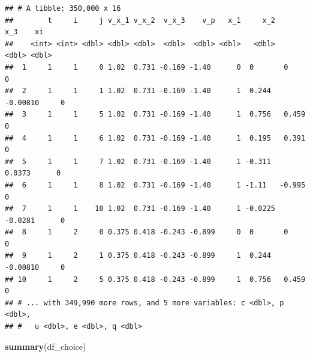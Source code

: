 \documentclass[]{book}
\newenvironment{Shaded}{\begin{snugshade}}{\end{snugshade}}
\newcommand{\KeywordTok}[1]{\textcolor[rgb]{0.13,0.29,0.53}{\textbf{#1}}}
\newcommand{\NormalTok}[1]{#1}
\begin{document}
\begin{verbatim}
## # A tibble: 350,000 x 16
##        t     i     j v_x_1 v_x_2  v_x_3    v_p   x_1     x_2      x_3    xi
##    <int> <int> <dbl> <dbl> <dbl>  <dbl>  <dbl> <dbl>   <dbl>    <dbl> <dbl>
##  1     1     1     0 1.02  0.731 -0.169 -1.40      0  0       0           0
##  2     1     1     1 1.02  0.731 -0.169 -1.40      1  0.244  -0.00810     0
##  3     1     1     5 1.02  0.731 -0.169 -1.40      1  0.756   0.459       0
##  4     1     1     6 1.02  0.731 -0.169 -1.40      1  0.195   0.391       0
##  5     1     1     7 1.02  0.731 -0.169 -1.40      1 -0.311   0.0373      0
##  6     1     1     8 1.02  0.731 -0.169 -1.40      1 -1.11   -0.995       0
##  7     1     1    10 1.02  0.731 -0.169 -1.40      1 -0.0225 -0.0281      0
##  8     1     2     0 0.375 0.418 -0.243 -0.899     0  0       0           0
##  9     1     2     1 0.375 0.418 -0.243 -0.899     1  0.244  -0.00810     0
## 10     1     2     5 0.375 0.418 -0.243 -0.899     1  0.756   0.459       0
## # ... with 349,990 more rows, and 5 more variables: c <dbl>, p <dbl>,
## #   u <dbl>, e <dbl>, q <dbl>
\end{verbatim}

\begin{Shaded}
\begin{Highlighting}[]
\KeywordTok{summary}\NormalTok{(df_choice)}
\end{Highlighting}
\end{Shaded}
\end{document}
